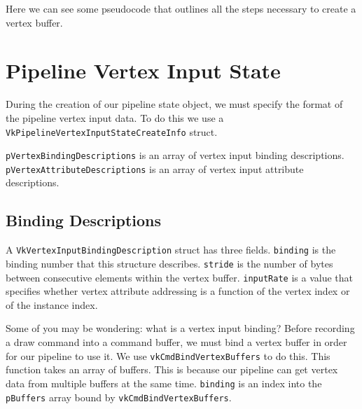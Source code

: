 Here we can see some pseudocode that outlines all the steps necessary to
create a vertex buffer.

\begin{minipage}{\linewidth}{\noindent}
    
\end{minipage}

\section{Pipeline Vertex Input State}

During the creation of our pipeline state object, we must specify
the format of the pipeline vertex input data.
To do this we use a \texttt{VkPipelineVertexInputStateCreateInfo} struct.

\texttt{pVertexBindingDescriptions} is an array of vertex input binding descriptions.
\texttt{pVertexAttributeDescriptions} is an array of vertex input attribute descriptions.

\begin{minipage}{\linewidth}{\noindent}
    
\end{minipage}

\subsection{Binding Descriptions}

A \texttt{VkVertexInputBindingDescription} struct has three fields.
\texttt{binding} is the binding number that this structure describes.
\texttt{stride} is the number of bytes between consecutive elements within the
vertex buffer.
\texttt{inputRate} is a value that specifies whether vertex attribute addressing
is a function of the vertex index or of the instance index.

Some of you may be wondering: what is a vertex input binding?
Before recording a draw command into a command buffer,
we must bind a vertex buffer in order for our pipeline to use it.
We use \texttt{vkCmdBindVertexBuffers} to do this.
This function takes an array of buffers.
This is because our pipeline can get vertex data from multiple buffers
at the same time.
\texttt{binding} is an index into the \texttt{pBuffers} array bound by
\texttt{vkCmdBindVertexBuffers}.

